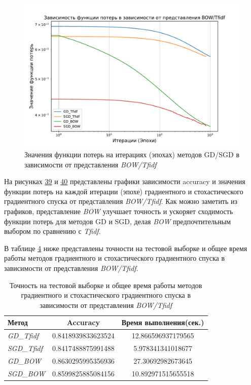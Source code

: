 \documentclass[14pt]{extarticle}
\begin{document}
\begin{figure}[H]
    \centering
    \includegraphics[width=0.7\linewidth]
    {exp_8_loss.pdf}
    \caption{Значения функции потерь на итерациях (эпохах) методов GD/SGD в зависимости от представления \textit{BOW/Tfidf}}
    \label{fig:exp_8_loss}
\end{figure}

На рисунках \hyperref[fig:exp_8_acc]{39} и \hyperref[fig:exp_8_loss]{40} представлены графики зависимости accuracy и значения функции потерь на каждой итерации (эпохе) градиентного и  стохастического градиентного спуска от представления \textit{BOW/Tfidf}. Как можно заметить из графиков, представление \textit{BOW} улучшает точность и ускоряет сходимость функции потерь для методов GD и SGD, делая \textit{BOW} предпочтительным выбором по сравнению с \textit{Tfidf}.

В таблице \hyperref[tab:exp_6_acc_time]{4} ниже представлены точности на тестовой выборке и общее время работы методов градиентного и стохастического градиентного спуска в зависимости от представления \textit{BOW/Tfidf}.

\begin{table}[H]
    \centering
    \begin{tabular}{|l|c|c|}
        \hline
        Метод & Accuracy & Время выполнения(сек.) \\ \hline
        \textit{GD\_Tfidf} & 0.8418939833623524 & 12.866596937179565 \\ \hline
        \textit{SGD\_Tfidf} & 0.8417488875991488 & 5.978341341018677 \\ \hline
        \textit{GD\_BOW} & 0.8630295995356936 & 27.30692982673645 \\ \hline
        \textit{SGD\_BOW} & 0.8599825885084156 & 10.892971515655518 \\ \hline
    \end{tabular}
    \caption{Точность на тестовой выборке и общее время работы методов градиентного и стохастического градиентного спуска в зависимости от представления \textit{BOW/Tfidf}}
    \label{tab:exp_8_acc_time}
\end{table}
\end{document}
